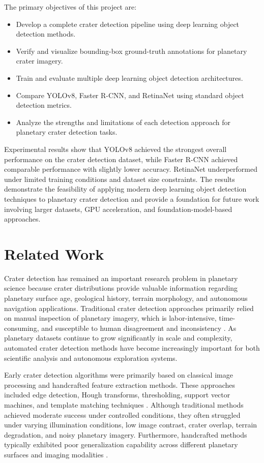 \documentclass[conference]{IEEEtran}
\begin{document}
	The primary objectives of this project are:
	
	\begin{itemize}
		\item Develop a complete crater detection pipeline using deep learning object detection methods.
		\item Verify and visualize bounding-box ground-truth annotations for planetary crater imagery.
		\item Train and evaluate multiple deep learning object detection architectures.
		\item Compare YOLOv8, Faster R-CNN, and RetinaNet using standard object detection metrics.
		\item Analyze the strengths and limitations of each detection approach for planetary crater detection tasks.
	\end{itemize}
	
	Experimental results show that YOLOv8 achieved the strongest overall performance on the crater detection dataset, while Faster R-CNN achieved comparable performance with slightly lower accuracy. RetinaNet underperformed under limited training conditions and dataset size constraints. The results demonstrate the feasibility of applying modern deep learning object detection techniques to planetary crater detection and provide a foundation for future work involving larger datasets, GPU acceleration, and foundation-model-based approaches.
	
	\section{Related Work}
	
	Crater detection has remained an important research problem in planetary science because crater distributions provide valuable information regarding planetary surface age, geological history, terrain morphology, and autonomous navigation applications. Traditional crater detection approaches primarily relied on manual inspection of planetary imagery, which is labor-intensive, time-consuming, and susceptible to human disagreement and inconsistency \cite{b2,b7}. As planetary datasets continue to grow significantly in scale and complexity, automated crater detection methods have become increasingly important for both scientific analysis and autonomous exploration systems.
	
	Early crater detection algorithms were primarily based on classical image processing and handcrafted feature extraction methods. These approaches included edge detection, Hough transforms, thresholding, support vector machines, and template matching techniques \cite{b2,b7}. Although traditional methods achieved moderate success under controlled conditions, they often struggled under varying illumination conditions, low image contrast, crater overlap, terrain degradation, and noisy planetary imagery. Furthermore, handcrafted methods typically exhibited poor generalization capability across different planetary surfaces and imaging modalities \cite{b2}.
	
\end{document}
